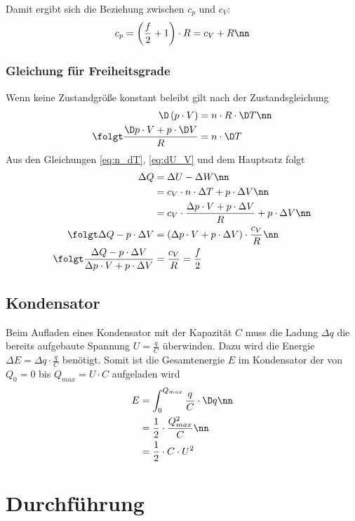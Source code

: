 \documentclass[12pt, a4paper, twoside]{scrartcl}
\begin{document}
Damit ergibt sich die Beziehung zwischen $c_p$ und $c_V$:
\begin{align}
 c_p = \left(\frac{f}{2}+1\right) \cdot R = c_V + R \nn
\end{align}

\subsubsection*{Gleichung für Freiheitsgrade}
Wenn keine Zustandgröße konstant beleibt gilt nach der Zustandsgleichung
\begin{align}
 \D \left(p\cdot V\right) &= n\cdot R\cdot \D T \nn\\
 \folgt \frac{\D p \cdot V + p \cdot \D V}{R} &= n \cdot \D T \label{eq:n_dT}
\end{align}
Aus den Gleichungen \eqref{eq:n_dT}, \eqref{eq:dU_V} und dem Hauptsatz folgt
\begin{align}
 \Delta Q &= \Delta U - \Delta W \nn\\
          &= c_V\cdot n\cdot \Delta T + p \cdot \Delta V \nn\\
          &= c_V \cdot \frac{\Delta p \cdot V + p \cdot \Delta V}{R} + p\cdot \Delta V \nn\\
 \folgt
 \Delta Q - p \cdot \Delta V &= \left(\Delta p \cdot V + p \cdot \Delta V\right)\cdot \frac{c_V}{R} \nn\\
 \folgt
 \frac{\Delta Q - p \cdot \Delta V}{\Delta p \cdot V + p \cdot \Delta V} &= \frac{c_V}{R} = \frac{f}{2} \label{eq:2}
\end{align}

\subsection{Kondensator}
Beim Aufladen eines Kondensator mit der Kapazität $C$ muss die Ladung $\Delta q$ die bereits aufgebaute Spannung $U = \frac{q}{C}$ überwinden. Dazu wird die Energie $\Delta E = \Delta q\cdot \frac{q}{C}$ benötigt.
Somit ist die Gesamtenergie $E$ im Kondensator der von $Q_0 = 0$ bis $Q_{max} = U \cdot C$ aufgeladen wird
\begin{align}
 E &= \int_{0}^{Q_{max}} \frac{q}{C}\cdot \D q \nn\\
   &= \frac{1}{2}\cdot\frac{Q_{max}^2}{C} \nn\\
   &= \frac{1}{2}\cdot C\cdot U^2
\end{align}



\section{Durchführung}
\label{sec:durchfuehrung}
\end{document}
